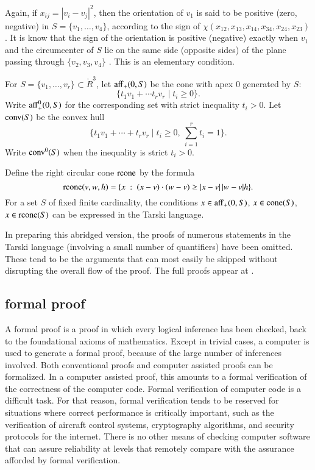 \documentclass{article} %
\begin{document}
Again, if $x_{ij}=|v_i-v_j|^2$, then the orientation
of $v_1$ is said to be positive (zero, negative) in $S=\{v_1,\ldots,v_4\}$,
according to the sign of $\chi(x_{12},x_{13},x_{14},x_{34},x_{24},x_{23})$.
It is know that the sign of the orientation is positive (negative) exactly
when $v_1$ and the circumcenter of $S$ lie on the same side (opposite sides) of the
plane passing through $\{v_2,v_3,v_4\}$ \cite[Lemma~5.15]{DCG}.  This is an elementary condition. 

For $S=\{v_1,\ldots,v_r\}\subset\ring{R}^3$, let ${\operatorname{aff}}_+(0,S)$
be the cone with apex $0$ generated by $S$:
  $$
  \{ t_1 v_1 + \cdots t_r v_r \mid  t_i \ge 0\}.
  $$
Write ${\operatorname{aff}}_+^0(0,S)$ for the corresponding set with
strict inequality $t_i >0$.
Let ${\operatorname{conv}}(S)$ be the convex hull
  $$
  \{ t_1 v_1 + \cdots + t_r v_r \mid t_i \ge 0,\ \sum_{i=1}^r t_i=1\}.
  $$
Write ${\operatorname{conv}}^0(S)$ when the inequality is strict $t_i >0$.

Define the right circular cone ${\operatorname{rcone}}$ by the formula
$${\operatorname{rcone}}(v,w,h) = \{x\ :\  (x-v)\cdot (w-v) \ge |x-v|\,|w-v| h\}.$$
For a set $S$ of fixed finite cardinality, the conditions $x\in{\operatorname{aff}}_+(0,S)$,
$x\in{\operatorname{cone}}(S)$, $x\in{\operatorname{rcone}}(S)$ can be expressed
in the Tarski language.

In preparing this abridged version, the proofs of numerous statements
in the Tarski language (involving a small number of quantifiers) have
been omitted.  These tend to be the arguments that can most easily
be skipped without disrupting the overall flow of the proof.
The full proofs appear at \cite{arx}.



\subsection{formal proof}

A formal proof is a proof in which every logical inference has
been checked, back to the foundational axioms of mathematics. 
Except in trivial cases, a computer is used to generate a formal
proof, because of the large number of inferences involved.
Both conventional proofs and computer assisted proofs can be
formalized.  In a computer assisted proof, this amounts to a
formal verification of the correctness of the computer code.
Formal verification of computer code is a difficult task.
For that reason,  formal verification tends to be reserved
for situations where correct performance 
is critically important, such as the verification of aircraft
control systems, cryptography algorithms, 
and security protocols for the internet.
There is no other means of checking 
computer software that can assure reliability at levels that
remotely compare with the
assurance afforded by formal verification. 
\end{document}
